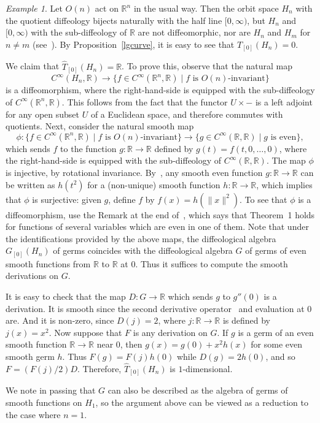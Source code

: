 \documentclass{amsart}
\theoremstyle{remark}
\newtheorem{ex}[de]{Example}
\newcommand{\ra}{\to}
\newcommand{\lra}{\longrightarrow}
\def \R{\mathbb{R}}
\begin{document}
\begin{ex}\label{halfline:quotient}
Let $O(n)$ act on $\R^n$ in the usual way.
Then the orbit space $H_n$ with the quotient diffeology bijects naturally with
the half line $[0,\infty)$,
but $H_n$ and $[0,\infty)$ with the sub-diffeology of $\R$ are not diffeomorphic,
nor are $H_n$ and $H_m$ for $n \neq m$ (see~\cite{I2}).
By Proposition~\ref{lgcurve}, it is easy to see that $T_{[0]}(H_n)=0$.

We claim that $\hat{T}_{[0]}(H_n)=\R$.
To prove this, observe that the natural map
\[ C^\infty(H_n, \R) \lra \{ f \in C^\infty(\R^n,\R) \mid f \text{ is $O(n)$-invariant} \} \]
is a diffeomorphism, where the right-hand-side is equipped with the sub-diffeology of $C^\infty(\R^n,\R)$.
This follows from the fact that the functor $U \times -$ is a left adjoint
for any open subset $U$ of a Euclidean space, and
therefore commutes with quotients.
Next, consider the natural smooth map
\[ \phi : \{ f \in C^\infty(\R^n, \R) \mid f \text{ is $O(n)$-invariant} \} \lra
          \{ g \in C^\infty(\R,   \R) \mid g \text{ is even} \} , \]
which sends $f$ to the function $g : \R \to \R$ defined by $g(t) = f(t,0,\ldots,0)$,
where the right-hand-side is equipped with the sub-diffeology of $C^\infty(\R,\R)$.
The map $\phi$ is injective, by rotational invariance.
By~\cite[Theorem~1]{Wh}, any smooth even function $g : \R \to \R$ can be
written as $h(t^2)$ for a (non-unique) smooth function $h : \R \to \R$,
which implies that $\phi$ is surjective: given $g$, define $f$ by $f(x) = h(\|x\|^2)$.
To see that $\phi$ is a diffeomorphism, use the Remark at the end of~\cite{Wh},
which says that Theorem~1 holds for functions of several variables which are
even in one of them.
Note that under the identifications provided by the above maps,
the diffeological algebra $G_{[0]}(H_n)$ of germs coincides
with the diffeological algebra $G$ of germs of even smooth functions from $\R$ to $\R$ at $0$.
Thus it suffices to compute the smooth derivations on $G$.

It is easy to check that the map $D : G \to \R$ which sends $g$ to $g''(0)$ is
a derivation.
It is smooth since the second derivative operator~\cite[Lemma~4.3]{CSW} and
evaluation at $0$ are.
And it is non-zero, since $D(j) = 2$,
where $j: \R \ra \R$ is defined by $j(x) = x^2$.
Now suppose that $F$ is any derivation on $G$.
If $g$ is a germ of an even smooth function $\R \to \R$ near $0$,
then $g(x) = g(0) + x^2 h(x)$ for some even smooth germ $h$.
Thus $F(g) = F(j) h(0)$ while $D(g) = 2 h(0)$, and so
$F = (F(j)/2) D$.
Therefore, $\hat{T}_{[0]}(H_n)$ is $1$-dimensional.

We note in passing that $G$ can also be described as the algebra of germs
of smooth functions on $H_1$, so the argument above can be viewed as a
reduction to the case where $n = 1$.
\end{ex}
\end{document}
